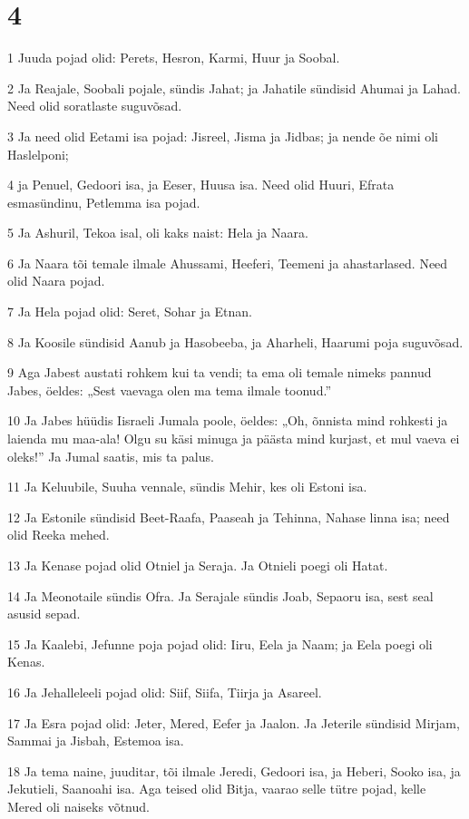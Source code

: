 \chapter{4}

\par 1 Juuda pojad olid: Perets, Hesron, Karmi, Huur ja Soobal.
\par 2 Ja Reajale, Soobali pojale, sündis Jahat; ja Jahatile sündisid Ahumai ja Lahad. Need olid soratlaste suguvõsad.
\par 3 Ja need olid Eetami isa pojad: Jisreel, Jisma ja Jidbas; ja nende õe nimi oli Haslelponi;
\par 4 ja Penuel, Gedoori isa, ja Eeser, Huusa isa. Need olid Huuri, Efrata esmasündinu, Petlemma isa pojad.
\par 5 Ja Ashuril, Tekoa isal, oli kaks naist: Hela ja Naara.
\par 6 Ja Naara tõi temale ilmale Ahussami, Heeferi, Teemeni ja ahastarlased. Need olid Naara pojad.
\par 7 Ja Hela pojad olid: Seret, Sohar ja Etnan.
\par 8 Ja Koosile sündisid Aanub ja Hasobeeba, ja Aharheli, Haarumi poja suguvõsad.
\par 9 Aga Jabest austati rohkem kui ta vendi; ta ema oli temale nimeks pannud Jabes, öeldes: „Sest vaevaga olen ma tema ilmale toonud.”
\par 10 Ja Jabes hüüdis Iisraeli Jumala poole, öeldes: „Oh, õnnista mind rohkesti ja laienda mu maa-ala! Olgu su käsi minuga ja päästa mind kurjast, et mul vaeva ei oleks!” Ja Jumal saatis, mis ta palus.
\par 11 Ja Keluubile, Suuha vennale, sündis Mehir, kes oli Estoni isa.
\par 12 Ja Estonile sündisid Beet-Raafa, Paaseah ja Tehinna, Nahase linna isa; need olid Reeka mehed.
\par 13 Ja Kenase pojad olid Otniel ja Seraja. Ja Otnieli poegi oli Hatat.
\par 14 Ja Meonotaile sündis Ofra. Ja Serajale sündis Joab, Sepaoru isa, sest seal asusid sepad.
\par 15 Ja Kaalebi, Jefunne poja pojad olid: Iiru, Eela ja Naam; ja Eela poegi oli Kenas.
\par 16 Ja Jehalleleeli pojad olid: Siif, Siifa, Tiirja ja Asareel.
\par 17 Ja Esra pojad olid: Jeter, Mered, Eefer ja Jaalon. Ja Jeterile sündisid Mirjam, Sammai ja Jisbah, Estemoa isa.
\par 18 Ja tema naine, juuditar, tõi ilmale Jeredi, Gedoori isa, ja Heberi, Sooko isa, ja Jekutieli, Saanoahi isa. Aga teised olid Bitja, vaarao selle tütre pojad, kelle Mered oli naiseks võtnud.
